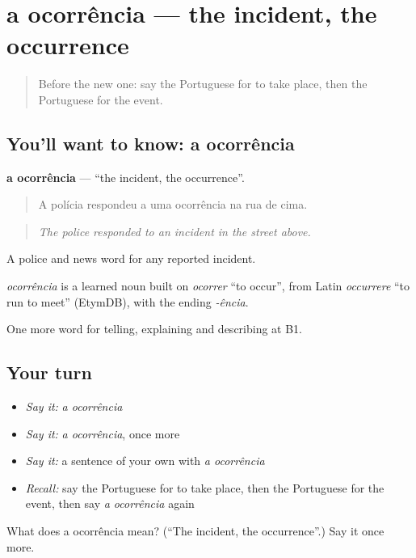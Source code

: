 \section[a ocorrência]{a ocorrência — the incident, the occurrence}

\label{lesson:PT-C271-ocorrencia}



\begin{quote}
Before the new one: say the Portuguese for to take place, then the Portuguese for the event.
\end{quote}

\subsection*{You'll want to know: a ocorrência}
\textbf{a ocorrência} — \textquotedblleft{}the incident, the occurrence\textquotedblright{}.

\begin{quote}
A polícia respondeu a uma ocorrência na rua de cima.
\end{quote}

\begin{quote}
\emph{The police responded to an incident in the street above.}
\end{quote}

A police and news word for any reported incident.

\begin{cousinweb}
\emph{ocorrência} is a learned noun built on \emph{ocorrer} \textquotedblleft{}to occur\textquotedblright{}, from Latin \emph{occurrere} \textquotedblleft{}to run to meet\textquotedblright{} (EtymDB), with the ending \emph{-ência}.
\end{cousinweb}

\begin{grammarlens}[title={What you've built}]
One more word for telling, explaining and describing at B1.
\end{grammarlens}

\subsection*{Your turn}
\begin{itemize}
\raggedright
  \item \emph{Say it:} \emph{a ocorrência}
  \item \emph{Say it:} \emph{a ocorrência}, once more
  \item \emph{Say it:} a sentence of your own with \emph{a ocorrência}
  \item \emph{Recall:} say the Portuguese for to take place, then the Portuguese for the event, then say \emph{a ocorrência} again
\end{itemize}

\begin{tcolorbox}[breakable,colback=teal!4,colframe=teal!35!black,title={Before you move on}]
What does a ocorrência mean? (\textquotedblleft{}The incident, the occurrence\textquotedblright{}.) Say it once more.
\end{tcolorbox}
